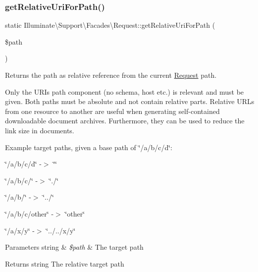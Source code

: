 \subsubsection{\texorpdfstring{get\+Relative\+Uri\+For\+Path()}{getRelativeUriForPath()}}
{\footnotesize\ttfamily static Illuminate\textbackslash{}\+Support\textbackslash{}\+Facades\textbackslash{}\+Request\+::get\+Relative\+Uri\+For\+Path (\begin{DoxyParamCaption}\item[{}]{\$path }\end{DoxyParamCaption})\hspace{0.3cm}{\ttfamily [static]}}

Returns the path as relative reference from the current \mbox{\hyperlink{class_illuminate_1_1_support_1_1_facades_1_1_request}{Request}} path.

Only the U\+R\+Is path component (no schema, host etc.) is relevant and must be given. Both paths must be absolute and not contain relative parts. Relative U\+R\+Ls from one resource to another are useful when generating self-\/contained downloadable document archives. Furthermore, they can be used to reduce the link size in documents.

Example target paths, given a base path of \char`\"{}/a/b/c/d\char`\"{}\+:
\begin{DoxyItemize}
\item \char`\"{}/a/b/c/d\char`\"{} -\/$>$ \char`\"{}\char`\"{}
\item \char`\"{}/a/b/c/\char`\"{} -\/$>$ \char`\"{}./\char`\"{}
\item \char`\"{}/a/b/\char`\"{} -\/$>$ \char`\"{}../\char`\"{}
\item \char`\"{}/a/b/c/other\char`\"{} -\/$>$ \char`\"{}other\char`\"{}
\item \char`\"{}/a/x/y\char`\"{} -\/$>$ \char`\"{}../../x/y\char`\"{}
\end{DoxyItemize}


\begin{DoxyParams}[1]{Parameters}
string & {\em \$path} & The target path \\
\hline
\end{DoxyParams}
\begin{DoxyReturn}{Returns}
string The relative target path 
\end{DoxyReturn}
\mbox{\label{class_illuminate_1_1_support_1_1_facades_1_1_request_ac2f5053668bc247ab6d042136cf3f048}} 
